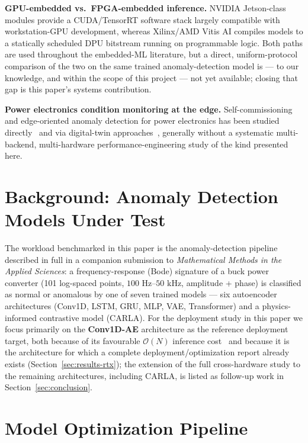 \documentclass[11pt,a4paper]{article}
\begin{document}
\textbf{GPU-embedded vs.\ FPGA-embedded inference.} NVIDIA Jetson-class modules provide a
CUDA/TensorRT software stack largely compatible with workstation-GPU development,
whereas Xilinx/AMD Vitis AI compiles models to a statically scheduled DPU bitstream
running on programmable logic. Both paths are used throughout the embedded-ML
literature, but a direct, uniform-protocol comparison of the two on the same trained
anomaly-detection model is --- to our knowledge, and within the scope of this
project --- not yet available; closing that gap is this paper's systems contribution.

\textbf{Power electronics condition monitoring at the edge.} Self-commissioning and
edge-oriented anomaly detection for power electronics has been studied
directly~\cite{gomez2023selfcommissioning} and via digital-twin
approaches~\cite{idrisov2025digitaltwin}, generally without a systematic multi-backend,
multi-hardware performance-engineering study of the kind presented here.

\section{Background: Anomaly Detection Models Under Test}
\label{sec:background}

The workload benchmarked in this paper is the anomaly-detection pipeline described in
full in a companion submission to \emph{Mathematical Methods in the Applied Sciences}:
a frequency-response (Bode) signature of a buck power converter (101 log-spaced points,
$100\text{ Hz}$--$50\text{ kHz}$, amplitude + phase) is classified as normal or
anomalous by one of seven trained models --- six autoencoder architectures (Conv1D,
LSTM, GRU, MLP, VAE, Transformer) and a physics-informed contrastive model (CARLA). For
the deployment study in this paper we focus primarily on the \textbf{Conv1D-AE}
architecture as the reference deployment target, both because of its favourable
$\mathcal O(N)$ inference cost~\cite{kiranyaz2019survey} and because it is the
architecture for which a complete deployment/optimization report already
exists (Section~\ref{sec:results-rtx}); the extension of the full cross-hardware study to
the remaining architectures, including CARLA, is listed as follow-up work in
Section~\ref{sec:conclusion}.

\section{Model Optimization Pipeline}
\label{sec:pipeline}
\end{document}
